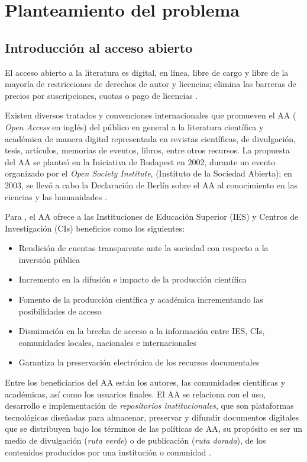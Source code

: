 \renewcommand{\chaptername}{Cap\'itulo}
\chapter{Planteamiento del problema} 

\section{Introducci\'on al acceso abierto}

El acceso abierto a la literatura es digital, en l\'inea, libre de cargo y libre de la mayor\'ia de restricciones de derechos de autor y licencias; elimina las barreras de precios por suscripciones, cuotas o pago de licencias \cite{PeterSuber2015}.\newline

Existen diversos tratados y convenciones internacionales que promueven el AA ( \textit{Open Access} en ingl\'es) del p\'ublico en general a la literatura cient\'ifica y acad\'emica de manera digital representada en revistas cient\'ificas, de divulgaci\'on, tesis, art\'iculos, memorias de eventos, libros, entre otros recursos. La propuesta del AA se plante\'o en la Iniciativa de Budapest en 2002, durante un evento organizado por el \textit{Open Society Institute}, (Instituto de la Sociedad Abierta); en 2003, se llev\'o a cabo la Declaraci\'on de Berl\'in sobre el AA al conocimiento en las ciencias y las humanidades \cite{para2010abierto}.

Para \cite{BeneficiosAA}, el AA ofrece a las Instituciones de Edu\-caci\'on Superior (IES) y Centros de Investigaci\'on (CIs) beneficios como los siguientes: 
\begin{itemize}
\item Rendici\'on de cuentas transparente ante la sociedad con respecto a la inversi\'on p\'ublica
\item Incremento en la difusi\'on e impacto de la producci\'on cient\'ifica  
\item Fomento de la producci\'on cient\'ifica y acad\'emica incrementando las posibilidades de acceso 
\item Dis\-mi\-nu\-ci\'on en la brecha de acceso a la informaci\'on entre IES, CIs, comunidades locales, nacionales e internacionales
\item Garantiza la preservaci\'on electr\'onica de los recursos documentales
\end{itemize}
 
Entre los beneficiarios del AA est\'an los autores, las comunidades cient\'ificas y acad\'emicas, as\'i como los usuarios finales. El AA se relaciona con el uso, desarrollo e implementaci\'on de \emph{repositorios institucionales}, que son plataformas tecnol\'ogicas dise\~{n}adas para almacenar, preservar y difundir documentos digitales que se distribuyen bajo los t\'erminos de las pol\'iticas de AA, su prop\'osito es ser un medio de divulgaci\'on (\textit{ruta verde}) o de publicaci\'on (\textit{ruta dorada}), de los contenidos producidos por una instituci\'on o comunidad \cite{RutaVerdeDorada}.
